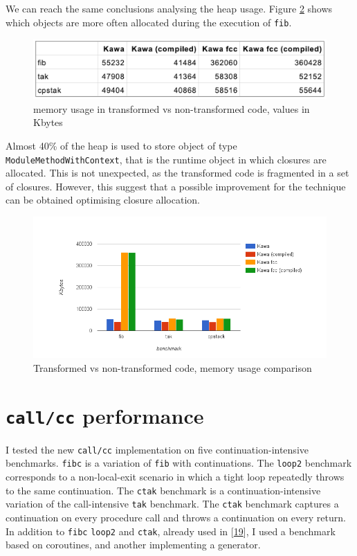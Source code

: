 \documentclass[12pt,a4paper,oneside,openright]{book}
\begin{document}
We can reach the same conclusions analysing the heap usage. Figure
\ref{heap} shows which objects are more often allocated during the
execution of \texttt{fib}.

\begin{figure}[htbp]
\centering
\includegraphics{figures/mem-overhead-table.pdf}
\caption{memory usage in transformed vs non-transformed code, values in
Kbytes \label{mem-overhead-table} \label{heap}}
\end{figure}

Almost 40\% of the heap is used to store object of type
\texttt{ModuleMethodWithContext}, that is the runtime object in which
closures are allocated. This is not unexpected, as the transformed code
is fragmented in a set of closures. However, this suggest that a
possible improvement for the technique can be obtained optimising
closure allocation.

\begin{figure}[htbp]
\centering
\includegraphics{figures/mem-overhead.png}
\caption{Transformed vs non-transformed code, memory usage comparison
\label{heap}}
\end{figure}

\section{\texorpdfstring{\texttt{call/cc}
performance}{call/cc performance}}\label{callcc-performance}

I tested the new \texttt{call/cc} implementation on five
continuation-intensive benchmarks. \texttt{fibc} is a variation of
\texttt{fib} with continuations. The \texttt{loop2} benchmark
corresponds to a non-local-exit scenario in which a tight loop
repeatedly throws to the same continuation. The \texttt{ctak} benchmark
is a continuation-intensive variation of the call-intensive \texttt{tak}
benchmark. The \texttt{ctak} benchmark captures a continuation on every
procedure call and throws a continuation on every return. In addition to
\texttt{fibc} \texttt{loop2} and \texttt{ctak}, already used in
{[}\hyperref[ref-Clinger1999]{19}{]}, I used a benchmark based on
coroutines, and another implementing a generator.
\end{document}
